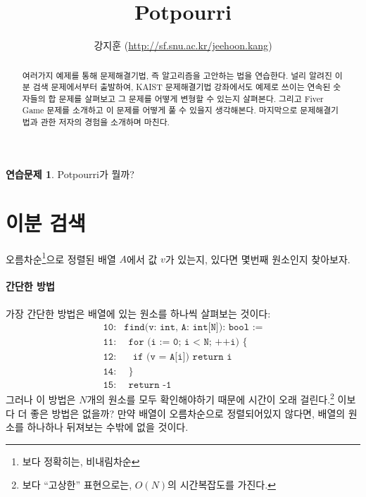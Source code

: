 \documentclass{oblivoir}
\theoremstyle{definition}
\newtheorem{exercise}{연습문제}
\begin{document}
\title{Potpourri}
\author{강지훈 (\url{http://sf.snu.ac.kr/jeehoon.kang})}
\maketitle

\begin{abstract}
  여러가지 예제를 통해 문제해결기법, 즉 알고리즘을 고안하는 법을
  연습한다.  널리 알려진 이분 검색 문제에서부터 출발하여, KAIST
  문제해결기법 강좌에서도 예제로 쓰이는 연속된 숫자들의 합 문제를
  살펴보고 그 문제를 어떻게 변형할 수 있는지 살펴본다. 그리고 Fiver
  Game 문제를 소개하고 이 문제를 어떻게 풀 수 있을지 생각해본다.
  마지막으로 문제해결기법과 관한 저자의 경험을 소개하며 마친다.
\end{abstract}

\begin{exercise}
Potpourri가 뭘까?
\end{exercise}

\section{이분 검색}
오름차순\footnote{보다 정확히는, 비내림차순}으로 정렬된 배열 $A$에서 값
$v$가 있는지, 있다면 몇번째 원소인지 찾아보자.

\paragraph{간단한 방법}
가장 간단한 방법은 배열에 있는 원소를 하나씩 살펴보는 것이다:
\begin{align*}
\texttt{10:}& \texttt{find(v: int, A: int[N]): bool :=} \\
\texttt{11:}& \ \ \texttt{for (i := 0; i < N; ++i) \{} \\
\texttt{12:}& \ \ \ \ \texttt{if (v = A[i]) return i} \\
\texttt{14:}& \ \ \texttt{\}} \\
\texttt{15:}& \ \ \texttt{return -1}
\end{align*}
\noindent 그러나 이 방법은 $N$개의 원소를 모두 확인해야하기 때문에
시간이 오래 걸린다.\footnote{보다 ``고상한'' 표현으로는, $O(N)$의
  시간복잡도를 가진다.}  이보다 더 좋은 방법은 없을까?  만약 배열이
오름차순으로 정렬되어있지 않다면, 배열의 원소를 하나하나 뒤져보는
수밖에 없을 것이다. 
\end{document}
